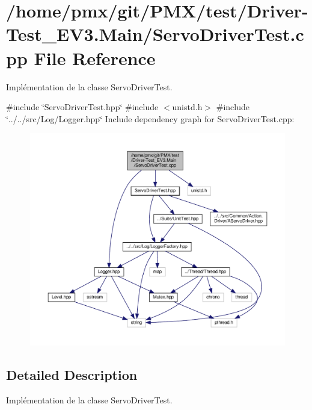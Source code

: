 \hypertarget{Driver-Test__EV3_8Main_2ServoDriverTest_8cpp}{}\section{/home/pmx/git/\+P\+M\+X/test/\+Driver-\/\+Test\+\_\+\+E\+V3.Main/\+Servo\+Driver\+Test.cpp File Reference}
\label{Driver-Test__EV3_8Main_2ServoDriverTest_8cpp}


Implémentation de la classe Servo\+Driver\+Test.  


{\ttfamily \#include \char`\"{}Servo\+Driver\+Test.\+hpp\char`\"{}}\newline
{\ttfamily \#include $<$unistd.\+h$>$}\newline
{\ttfamily \#include \char`\"{}../../src/\+Log/\+Logger.\+hpp\char`\"{}}\newline
Include dependency graph for Servo\+Driver\+Test.\+cpp\+:
\nopagebreak
\begin{figure}[H]
\begin{center}
\leavevmode
\includegraphics[width=350pt]{Driver-Test__EV3_8Main_2ServoDriverTest_8cpp__incl}
\end{center}
\end{figure}


\subsection{Detailed Description}
Implémentation de la classe Servo\+Driver\+Test. 

